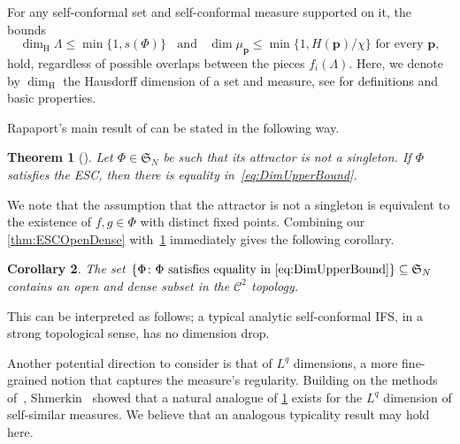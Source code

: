 \documentclass[11pt,]{article}
\def\cref#1{\ref{#1}}%
\newtheorem{theorem}{Theorem}[section]
\newtheorem{corollary}[theorem]{Corollary}
\theoremstyle{definition}
\theoremstyle{remark}
\newcommand{\0}{\mathbf{0}}
\begin{document}
For any self-conformal set and self-conformal measure supported on it, the bounds
\begin{equation}\label{eq:DimUpperBound}
\dim_{\mathrm{H}} \Lambda \leq \min\{1,s(\Phi)\}  \;\;\text{ and }\;\; \dim \mu_{\mathbf{p}} \leq
\min\{1, H(\mathbf{p})/\chi\} \text{ for every } \mathbf{p},
\end{equation} 
hold, regardless of possible overlaps between the pieces $f_i(\Lambda)$.
Here, we denote by $\dim_{\mathrm H}$ the Hausdorff dimension of a set and measure, see
\cite{FalconerBook} for definitions and basic properties.

Rapaport's main result of \cite{Rapaport_SelfConfESC25arXiv}
can be stated in the following way.

\begin{theorem}[\cite{Rapaport_SelfConfESC25arXiv}]\label{thm:RapaportMain}
  Let $\Phi\in\mathfrak{S}_N$ be such that its attractor is not a singleton. If
  $\Phi$ satisfies the ESC, then there is equality in~\cref{eq:DimUpperBound}.
\end{theorem}
We note that the assumption that the attractor is not a singleton is equivalent to the existence of
$f,g\in\Phi$ with distinct fixed points.
Combining our \cref{thm:ESCOpenDense} with~\cref{thm:RapaportMain} immediately gives the following corollary.

\begin{corollary}\label{cor:dim}
  The set $\{\Phi \colon \Phi \text{ satisfies equality in \cref{eq:DimUpperBound}}\}\subseteq
  \mathfrak{S}_N$ contains an open and dense subset in the $\mathcal{C}^2$ topology.
\end{corollary}
This can be interpreted as follows; a typical analytic self-conformal IFS, in a strong topological
sense, has no dimension drop.

Another potential direction to consider is that of $L^q$ dimensions, a more fine-grained notion that
captures the measure's regularity.  Building on the methods of~\cite{Hochman_SelfSimESC_Annals},
Shmerkin~\cite{Shmerkin_LqSelfSim_Annals} showed that a natural analogue of \cref{thm:RapaportMain}
exists for the $L^q$ dimension of self-similar measures. We believe that an analogous typicality
result may hold here.

\end{document}
